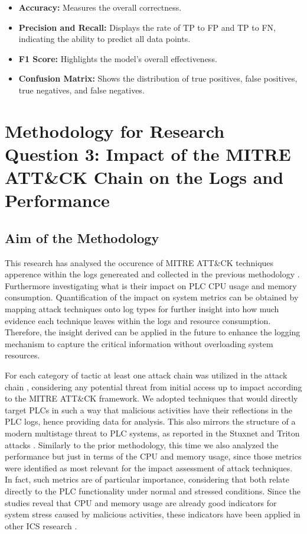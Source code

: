 \documentclass[Master,BMR,english]{twbook}
\begin{document}
\begin{itemize}
    \item \textbf{Accuracy:} Measures the overall correctness.
    \item \textbf{Precision and Recall:} Displays the rate of TP to FP and TP to FN, indicating the ability to predict all data points.
    \item \textbf{F1 Score:} Highlights the model’s overall effectiveness.
    \item \textbf{Confusion Matrix:} Shows the distribution of true positives, false positives, true negatives, and false negatives.
\end{itemize}


\section{Methodology for Research Question 3: Impact of the MITRE ATT\&CK Chain on the Logs and Performance}

\subsection{Aim of the Methodology}

This research has analysed the occurence of MITRE ATT\&CK techniques apperence within the logs  genereated and collected in the previous methodology \cite{mitre_attack_chain} \cite{mitre_attack_ics}. Furthermore investigating what is their impact on PLC CPU usage and memory consumption. Quantification of the impact on system metrics can be obtained by mapping attack techniques onto log types for further insight into how much evidence each technique leaves within the logs and resource consumption. Therefore, the insight derived can be applied in the future to enhance the logging mechanism to capture the critical information without overloading system resources.

For each category of tactic at least one attack chain was utilized in the attack chain , considering any potential threat from initial access up to impact according to the MITRE ATT\&CK framework. We adopted techniques that would directly target PLCs in such a way that malicious activities have their reflections in the PLC logs, hence providing data for analysis. This also mirrors the structure of a modern multistage threat to PLC systems, as reported in the Stuxnet and Triton attacks \cite{mitre_attack_stuxnet}\cite{mitre_attack_triton}. Similarly to the prior methodology, this time we also analyzed the performance but just in terms of the CPU and memory usage, since those metrics were identified as most relevant for the impact assessment of attack techniques. In fact, such metrics are of particular importance, considering that both relate directly to the PLC functionality under normal and stressed conditions. Since the studies reveal that CPU and memory usage are already good indicators for system stress caused by malicious activities, these indicators have been applied in other ICS research \cite{tasca_improving_nodate} \cite{mubarak_industrial_2022}.
\end{document}

